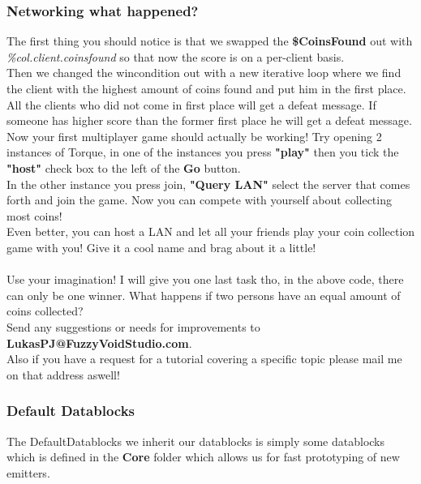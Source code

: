 \begin{frame}
\frametitle{Networking what happened?}
The first thing you should notice is that we swapped the {\bf \$CoinsFound} out with {\it \%col.client.coinsfound} so that now the score is on a per-client basis.\\
Then we changed the wincondition out with a new iterative loop where we find the client with the highest amount of coins found and put him in the first place.\\
All the clients who did not come in first place will get a defeat message. If someone has higher score than the former first place he will get a defeat message.\\
Now your first multiplayer game should actually be working! Try opening 2 instances of Torque, in one of the instances you press {\bf "play"} then you tick the
{\bf "host"} check box to the left of the {\bf Go} button.\\
In the other instance you press join, {\bf "Query LAN"} select the server that comes forth and join the game. Now you can compete with yourself about collecting most coins!\\
Even better, you can host a LAN and let all your friends play your coin collection game with you! Give it a cool name and brag about it a little!\\
\\
Use your imagination! I will give you one last task tho, in the above code, there can only be one winner. What happens if two persons have an equal amount of coins collected?\\
Send any suggestions or needs for improvements to {\bf LukasPJ@FuzzyVoidStudio.com}.\\
Also if you have a request for a tutorial covering a specific topic please mail me on that address aswell!
\end{frame}

\begin{frame}
\frametitle{Default Datablocks}
The DefaultDatablocks we inherit our datablocks is simply some datablocks which is defined in the {\bf Core} folder which allows us for fast prototyping of new emitters.
\end{frame}

